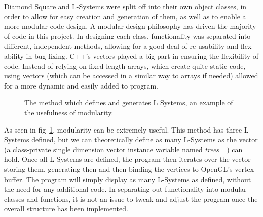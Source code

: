 \documentclass[a4paper,10pt]{report}
\begin{document}
Diamond Square and L-Systems were split off into their own object classes, in order to allow for easy creation and generation of them, as well as to enable a more modular code design. A modular design philosophy has driven the majority of code in this project. In designing each class, functionality was separated into different, independent methods, allowing for a good deal of re-usability and flex-ability in bug fixing. C++'s vectors played a big part in ensuring the flexibility of code. Instead of relying on fixed length arrays, which create quite static code, using vectors (which can be accessed in a similar way to arrays if needed) allowed for a more dynamic and easily added to program. \\

\begin{figure}[h!]
\centering
 \caption{The method which defines and generates L Systems, an example of the usefulness of modularity.}
 \label{fig:tree_generation}
\end{figure}

As seen in fig~\ref{fig:tree_generation}, modularity can be extremely useful. This method has three L-Systems defined, but we can theoretically define as many L-Systems as the vector (a class-private single dimension vector instance variable named \textit{trees\_} ) can hold. Once all L-Systems are defined, the program then iterates over the vector storing them, generating then and then binding the vertices to OpenGL's vertex buffer. The program will simply display as many L-Systems as defined, without the need for any additional code. In separating out functionality into modular classes and functions, it is not an issue to tweak and adjust the program once the overall structure has been implemented.
\end{document}
